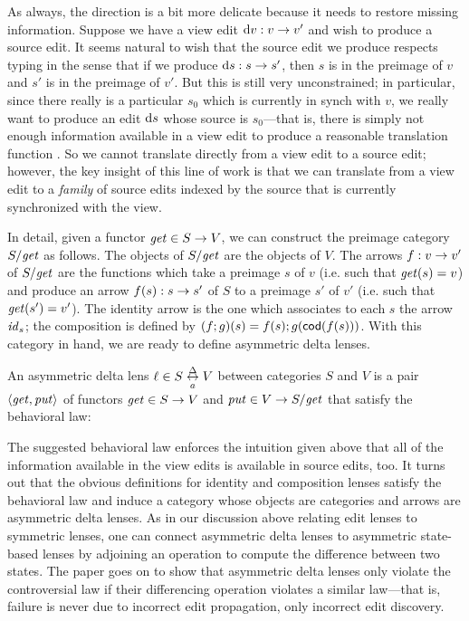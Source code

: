 As always, the \PUT direction is a bit more delicate because it needs to
restore missing information. Suppose we have a view edit $\textrm{d} v : v \to
v'$ and wish to produce a source edit. It seems natural to wish that the
source edit we produce respects typing in the sense that if we produce $\textrm{d} s
: s \to s'$, then $s$ is in the preimage of $v$ and $s'$ is in the
preimage of $v'$. But this is still very unconstrained; in particular, since
there really is a particular $s_0$ which is currently in synch with $v$, we
really want to produce an edit $\textrm{d} s$ whose source is $s_0$---that is, there
is simply not enough information available in a view edit to produce a
reasonable translation function \PUT. So we cannot translate directly from a
view edit to a source edit; however, the key insight of this line of work is
that we can translate from a view edit to a \emph{family} of source edits
indexed by the source that is currently synchronized with the view.

In detail, given a functor $\mathit{get} \in S \to V$, we can construct the
preimage category $S/\mathit{get}$ as follows. The objects of $S/\mathit{get}$ are the
objects of $V$. The arrows $f : v \to v'$ of $S/\mathit{get}$ are the functions
which take a preimage $s$ of $v$ (i.e. such that $\mathit{get}(s)=v$) and produce
an arrow $f(s) : s \to s'$ of $S$ to a preimage $s'$ of $v'$ (i.e. such that
$\mathit{get}(s')=v'$). The identity arrow is the one which associates to each $s$
the arrow $\mathit{id}_s$; the composition is defined by
$(f;g)(s)=f(s);g(\mathsf{cod}(f(s)))$. With this category in hand, we are ready to
define asymmetric delta lenses.

\begin{definition}
    An asymmetric delta lens $\ell \in S \underset{a}{\overset{\Delta}{\leftrightarrow}} V$ between categories $S$
    and $V$ is a pair $\left<\mathit{get},\mathit{put}\right>$ of functors $\mathit{get} \in S
    \to V$ and $\mathit{put} \in V \to S/\mathit{get}$ that satisfy the behavioral law:
\end{definition}

The suggested behavioral law enforces the intuition given above that all of
the information available in the view edits is available in source edits,
too. It turns out that the obvious definitions for identity and composition
lenses satisfy the behavioral law and induce a category whose objects are
categories and arrows are asymmetric delta lenses. As in our discussion
above relating edit lenses to symmetric lenses, one can connect asymmetric
delta lenses to asymmetric state-based lenses by adjoining an operation to
compute the difference between two states. The paper goes on to show that
asymmetric delta lenses only violate the controversial  law if
their differencing operation violates a similar  law---that is,
failure is never due to incorrect edit propagation, only incorrect edit
discovery.

